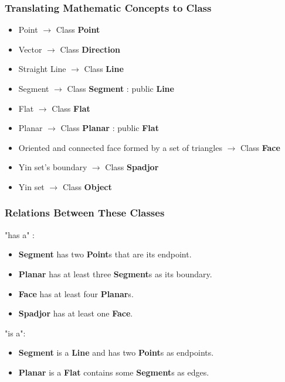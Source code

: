 \documentclass{beamer}
\begin{document}
\begin{frame}
  \frametitle{Translating Mathematic Concepts to Class}
  \begin{itemize}
  \item Point $\to$ Class \textbf{Point}
  \item Vector $\to$ Class \textbf{Direction}
  \item Straight Line $\to$ Class \textbf{Line}
  \item Segment $\to$ Class \textbf{Segment} : public \textbf{Line}  
  \item Flat $\to$ Class \textbf{Flat}
  \item Planar $\to$ Class \textbf{Planar} : public \textbf{Flat}
  \item Oriented and connected face formed by a set of triangles $\to$ Class \textbf{Face}
  \item Yin set's boundary $\to$ Class \textbf{Spadjor}
  \item Yin set $\to$ Class \textbf{Object}
  \end{itemize}
\end{frame}

\begin{frame}
  \frametitle{Relations Between These Classes}
  "has a" :
  \begin{itemize}
  \item \textbf{Segment} has two \textbf{Point}s that are its endpoint.  
  \item \textbf{Planar} has at least three \textbf{Segment}s as its boundary.
  \item \textbf{Face} has at least four \textbf{Planar}s.
  \item \textbf{Spadjor} has at least one \textbf{Face}.  
  \end{itemize}

  "is a":
  \begin{itemize}
  \item \textbf{Segment} is a \textbf{Line} and has two \textbf{Point}s as endpoints.
   

    
  \item \textbf{Planar} is a \textbf{Flat} contains some \textbf{Segment}s as edges.
  \end{itemize}
\end{frame}
\end{document}
